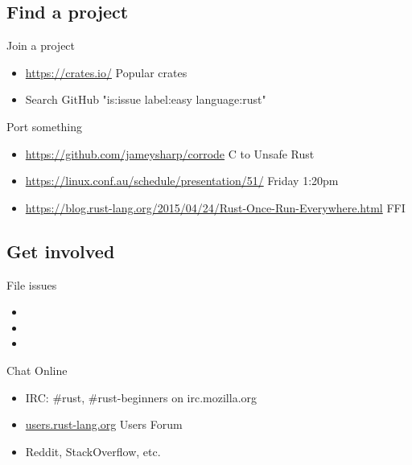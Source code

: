 \documentclass[50pt]{beamer}
\begin{document}
\subsection{Find a project}

    \begin{frame}
        Join a project
        \begin{itemize}
            \item \url{https://crates.io/} Popular crates
            \item Search GitHub "is:issue label:easy language:rust"
        \end{itemize}
    \end{frame}

    \begin{frame}
        Port something
        \begin{itemize}
            \item \url{https://github.com/jameysharp/corrode} C to Unsafe Rust
            \item \url{https://linux.conf.au/schedule/presentation/51/} Friday 1:20pm
            \item \url{https://blog.rust-lang.org/2015/04/24/Rust-Once-Run-Everywhere.html} FFI
        \end{itemize}
    \end{frame}


\subsection{Get involved}

    \begin{frame}
        File issues
        \begin{itemize}
            \item
            \item
            \item
        \end{itemize}
    \end{frame}

    \begin{frame}
        Chat Online
        \begin{itemize}
            \item IRC: \#rust, \#rust-beginners on irc.mozilla.org
            \item \url{users.rust-lang.org} Users Forum
            \item Reddit, StackOverflow, etc.
        \end{itemize}
    \end{frame}
\end{document}
